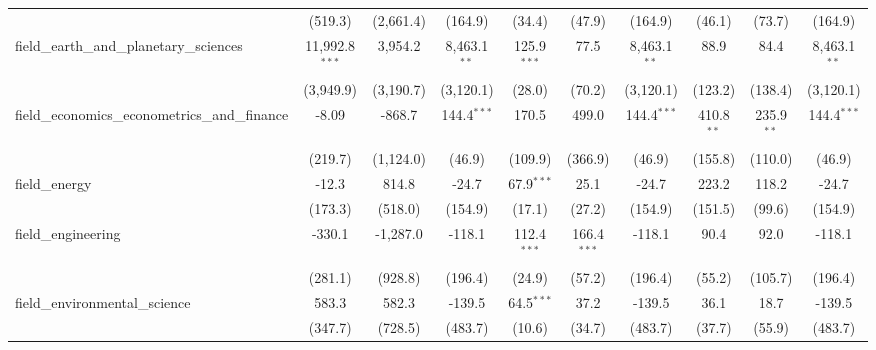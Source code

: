 \begin{tabular}{lccccccccc}
                                                               & (519.3)          & (2,661.4)       & (164.9)        & (34.4)        & (47.9)        & (164.9)        & (46.1)        & (73.7)        & (164.9)\\   
   field\_earth\_and\_planetary\_sciences                      & 11,992.8$^{***}$ & 3,954.2         & 8,463.1$^{**}$ & 125.9$^{***}$ & 77.5          & 8,463.1$^{**}$ & 88.9          & 84.4          & 8,463.1$^{**}$\\   
                                                               & (3,949.9)        & (3,190.7)       & (3,120.1)      & (28.0)        & (70.2)        & (3,120.1)      & (123.2)       & (138.4)       & (3,120.1)\\   
   field\_economics\_econometrics\_and\_finance                & -8.09            & -868.7          & 144.4$^{***}$  & 170.5         & 499.0         & 144.4$^{***}$  & 410.8$^{**}$  & 235.9$^{**}$  & 144.4$^{***}$\\   
                                                               & (219.7)          & (1,124.0)       & (46.9)         & (109.9)       & (366.9)       & (46.9)         & (155.8)       & (110.0)       & (46.9)\\   
   field\_energy                                               & -12.3            & 814.8           & -24.7          & 67.9$^{***}$  & 25.1          & -24.7          & 223.2         & 118.2         & -24.7\\   
                                                               & (173.3)          & (518.0)         & (154.9)        & (17.1)        & (27.2)        & (154.9)        & (151.5)       & (99.6)        & (154.9)\\   
   field\_engineering                                          & -330.1           & -1,287.0        & -118.1         & 112.4$^{***}$ & 166.4$^{***}$ & -118.1         & 90.4          & 92.0          & -118.1\\   
                                                               & (281.1)          & (928.8)         & (196.4)        & (24.9)        & (57.2)        & (196.4)        & (55.2)        & (105.7)       & (196.4)\\   
   field\_environmental\_science                               & 583.3            & 582.3           & -139.5         & 64.5$^{***}$  & 37.2          & -139.5         & 36.1          & 18.7          & -139.5\\   
                                                               & (347.7)          & (728.5)         & (483.7)        & (10.6)        & (34.7)        & (483.7)        & (37.7)        & (55.9)        & (483.7)\\   

\end{tabular}
